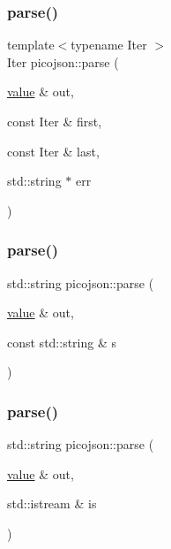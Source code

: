 \hypertarget{namespacepicojson_a21621c03c9c8c83dcf5bc604d1cafdf6}{}\label{namespacepicojson_a21621c03c9c8c83dcf5bc604d1cafdf6} 
\subsubsection{\texorpdfstring{parse()}{parse()}\hspace{0.1cm}{\footnotesize\ttfamily [2/4]}}
{\footnotesize\ttfamily template$<$typename Iter $>$ \\
Iter picojson\+::parse (\begin{DoxyParamCaption}\item[{\hyperlink{classpicojson_1_1value}{value} \&}]{out,  }\item[{const Iter \&}]{first,  }\item[{const Iter \&}]{last,  }\item[{std\+::string $\ast$}]{err }\end{DoxyParamCaption})\hspace{0.3cm}{\ttfamily [inline]}}

\hypertarget{namespacepicojson_a522ebeba3ce386f1df0aba41ae3b7763}{}\label{namespacepicojson_a522ebeba3ce386f1df0aba41ae3b7763} 
\subsubsection{\texorpdfstring{parse()}{parse()}\hspace{0.1cm}{\footnotesize\ttfamily [3/4]}}
{\footnotesize\ttfamily std\+::string picojson\+::parse (\begin{DoxyParamCaption}\item[{\hyperlink{classpicojson_1_1value}{value} \&}]{out,  }\item[{const std\+::string \&}]{s }\end{DoxyParamCaption})\hspace{0.3cm}{\ttfamily [inline]}}

\hypertarget{namespacepicojson_a2ed8a3cba445c8ecbe3d6a3a3fbdabd3}{}\label{namespacepicojson_a2ed8a3cba445c8ecbe3d6a3a3fbdabd3} 
\subsubsection{\texorpdfstring{parse()}{parse()}\hspace{0.1cm}{\footnotesize\ttfamily [4/4]}}
{\footnotesize\ttfamily std\+::string picojson\+::parse (\begin{DoxyParamCaption}\item[{\hyperlink{classpicojson_1_1value}{value} \&}]{out,  }\item[{std\+::istream \&}]{is }\end{DoxyParamCaption})\hspace{0.3cm}{\ttfamily [inline]}}

